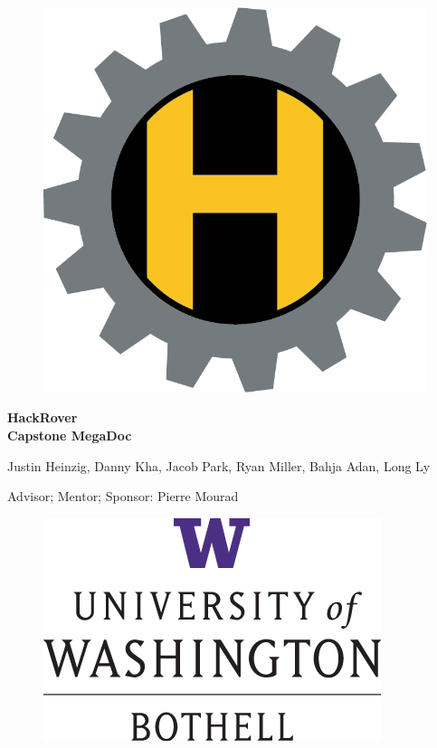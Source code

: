 \documentclass[a4paper, 10pt]{article}
\begin{document}
\begin{titlepage}

	\begin{figure}[h]
		\centering
		\includegraphics[scale=.8]{Photos/HackRoverlogolofi}
	\end{figure}

	\begin{center}
		\vspace*{1cm}
	
		\Huge
		\textbf{HackRover}\\[10pt]
	
	
		\large
		\textbf{Capstone MegaDoc}\\[40pt]

		\begin{changemargin}{10pt}{10pt} 
		\begin{center}
		\normalsize
		Justin Heinzig, Danny Kha, Jacob Park, Ryan Miller, Bahja Adan, Long Ly
	
		Advisor; Mentor; Sponsor: Pierre Mourad\\[150pt]
		\end{center}
		\end{changemargin}
	\end{center}
	
	\begin{figure}[h]
		\centering
		\includegraphics[scale=.8]{Photos/UWLogo}
	\end{figure}		
	

\end{titlepage}
\end{document}
